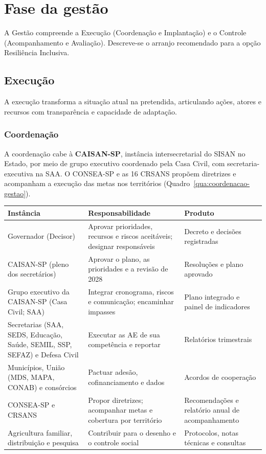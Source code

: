 \documentclass[
	12pt,				%
	openright,			%
	oneside,			%
	a4paper,			%
	chapter=TITLE,		%
	section=TITLE,		%
	english,			%
	french,				%
	spanish,			%
	brazil,				%
 ]{abntex2}
\begin{document}
\chapter{Fase da gestão}
A Gestão compreende a Execução (Coordenação e Implantação) e o Controle
(Acompanhamento e Avaliação). Descreve-se o
arranjo recomendado para a opção Resiliência Inclusiva.

\section{Execução}
A execução transforma a situação atual na pretendida, articulando ações,
atores e recursos com transparência e capacidade de adaptação.

\subsection{Coordenação}
A coordenação cabe à \textbf{CAISAN-SP}, instância intersecretarial do SISAN no
Estado, por meio de grupo executivo coordenado pela Casa Civil, com
secretaria-executiva na SAA. O CONSEA-SP e as 16 CRSANS propõem diretrizes e
acompanham a execução das metas nos territórios
(Quadro~\ref{qua:coordenacao-gestao}).

\begin{quadro}[!htbp]
\centering
\caption{Arranjo de coordenação da opção estratégica}
\label{qua:coordenacao-gestao}
\footnotesize
\renewcommand{\arraystretch}{1.05}
\setlength{\tabcolsep}{3pt}
\begin{tabularx}{\textwidth}{|>{\raggedright\arraybackslash}p{3.4cm}|>{\raggedright\arraybackslash}X|>{\raggedright\arraybackslash}p{3.6cm}|}
\hline
\textbf{Instância} & \textbf{Responsabilidade} & \textbf{Produto} \\
\hline
Governador (Decisor) & Aprovar prioridades, recursos e riscos aceitáveis; designar responsáveis & Decreto e decisões registradas \\
\hline
CAISAN-SP (pleno dos secretários) & Aprovar o plano, as prioridades e a revisão de 2028 & Resoluções e plano aprovado \\
\hline
Grupo executivo da CAISAN-SP (Casa Civil; SAA) & Integrar cronograma, riscos e comunicação; encaminhar impasses & Plano integrado e painel de indicadores \\
\hline
Secretarias (SAA, SEDS, Educação, Saúde, SEMIL, SSP, SEFAZ) e Defesa Civil & Executar as AE de sua competência e reportar & Relatórios trimestrais \\
\hline
Municípios, União (MDS, MAPA, CONAB) e consórcios & Pactuar adesão, cofinanciamento e dados & Acordos de cooperação \\
\hline
CONSEA-SP e CRSANS & Propor diretrizes; acompanhar metas e cobertura por território & Recomendações e relatório anual de acompanhamento \\
\hline
Agricultura familiar, distribuição e pesquisa & Contribuir para o desenho e o controle social & Protocolos, notas técnicas e consultas \\
\hline
\end{tabularx}
\end{quadro}
\end{document}
